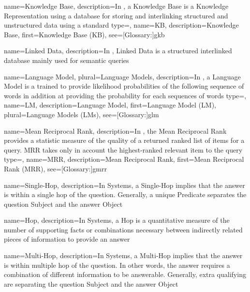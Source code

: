 {
  name={Knowledge Base},
  description={In , a Knowledge Base is a Knowledge Representation using a  database for storing and interlinking structured and unstructured data using a standard}
}
{
  type=\acronymtype,
  name={KB},
  description={Knowledge Base},
  first={Knowledge Base (KB)},
  see=[Glossary:]{gkb}
}


{
  name={Linked Data},
  description={In , Linked Data is a structured interlinked database mainly used for semantic queries}
}

{
  name={Language Model},
  plural={Language Models},
  description={In , a Language Model is a  trained to provide likelihood probabilities of the following sequence of words in addition at providing the probability for each sequences of words}
}
{
  type=\acronymtype,
  name={LM},
  description={Language Model},
  first={Language Model (LM)},
  plural={Language Models (LMs)},
  see=[Glossary:]{glm}
}

{
  name={Mean Reciprocal Rank},
  description={In , the Mean Reciprocal Rank provides a statistic measure of the quality of a returned ranked list of items for a query. MRR takes only in account the highest-ranked relevant item to the query}
}
{
  type=\acronymtype,
  name={MRR},
  description={Mean Reciprocal Rank},
  first={Mean Reciprocal Rank (MRR)},
  see=[Glossary:]{gmrr}
}


{
  name={Single-Hop},
  description={In  Systems, a Single-Hop implies that the answer is within a single \gls{hop} of the question. Generally, a unique Predicate separates the question Subject and the answer Object}
}

{
  name={Hop},
  description={In  Systems, a Hop is a quantitative measure of the number of supporting facts or combinations necessary between indirectly related pieces of information to provide an answer}
}


{
  name={Multi-Hop},
  description={In  Systems, a Multi-Hop implies that the answer is within multiple \gls{hop} of the question. In other words, the answer requires a combination of different information to be answerable. Generally, extra qualifying  are separating the question Subject and the answer Object}
}

